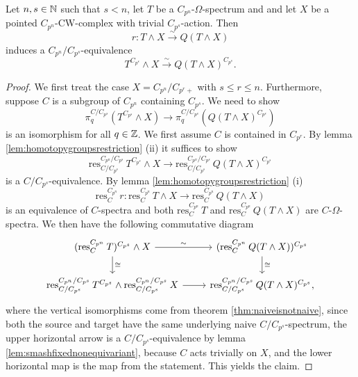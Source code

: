 \begin{lem}\label{lem:smashfixed}
Let $n,s\in \mathbb{N}$ such that $s<n$, let $T$ be a $C_{p^n}$-$\Omega$-spectrum and 
and let $X$ be a pointed $C_{p^n}$-CW-complex with trivial
$C_{p^s}$-action. Then 
\begin{equation}\label{eq:smashfixedfibrant}
r:T\wedge X\xrightarrow{\sim} Q(T\wedge X)
\end{equation}
induces a $C_{p^n}/C_{p^s}$-equivalence
\[
T^{C_{p^s}}\wedge X\xrightarrow{\sim} Q(T\wedge X)^{C_{p^s}}.
\]
\end{lem}

\begin{proof}
We first treat the case $X = C_{p^n}/C_{p^r+}$ with $s\le r\le n$. 
Furthermore, suppose $C$ is a subgroup of $C_{p^n}$
containing $C_{p^s}$. We need to show
\[
\pi_q^{C/C_{p^s}}(T^{C_{p^s}}\wedge X)\to \pi_q^{C/C_{p^s}}(Q(T\wedge X)^{C_{p^s}})
\]
is an isomorphism for all $q\in \mathbb{Z}$. We first assume $C$ is contained in $C_{p^r}$.
By lemma \ref{lem:homotopygroupsrestriction}
(ii) it suffices to show 
\begin{equation}
\mathrm{res}^{C_{p^n}/C_{p^s}}_{C/C_{p^s}}\, T^{C_{p^s}}\wedge X\to
\mathrm{res}^{C_{p^n}/C_{p^s}}_{C/C_{p^s}}\, Q(T\wedge X)^{C_{p^s}}
\end{equation}
is a $C/C_{p^s}$-equivalence. By lemma \ref{lem:homotopygroupsrestriction} (i)
\[
\mathrm{res}^{C_{p^n}}_C\, r: \mathrm{res}^{C_{p^n}}_C\, T\wedge X\to
\mathrm{res}^{C_{p^n}}_C\, Q(T\wedge X)
\]
is an equivalence of $C$-spectra and both $\mathrm{res}^{C_{p^n}}_C\,T$ 
and $\mathrm{res}^{C_{p^n}}_C\, Q(T\wedge X)$ are $C$-$\Omega$-spectra.
We then have the following commutative diagram
\[
\begin{tikzcd}
(\mathrm{res}^{C_{p^n}}_C\, T)^{C_{p^s}}\wedge X
\arrow{r}{\sim}\arrow{d}{\cong}
&(\mathrm{res}^{C_{p^n}}_C\, Q(T\wedge X))^{C_{p^s}}
\arrow{d}{\cong}\\
\mathrm{res}^{C_{p^n}/C_{p^s}}_{C/C_{p^s}}\, T^{C_{p^s}}\wedge \mathrm{res}^{C_{p^n}/C_{p^s}}_{C/C_{p^s}}\, X
\arrow{r}
&\mathrm{res}^{C_{p^n}/C_{p^s}}_{C/C_{p^s}}\, Q(T\wedge X)^{C_{p^s}},
\end{tikzcd}
\]
where the vertical isomorphisms come from theorem \ref{thm:naiveisnotnaive},
since both the source and target have the same underlying naive $C/C_{p^s}$-spectrum,
the upper horizontal arrow is a $C/C_{p^s}$-equivalence by lemma
\ref{lem:smashfixednonequivariant}, because $C$ acts trivially on $X$,
and the lower horizontal map is the map from the statement. This yields the claim.


\end{proof}
